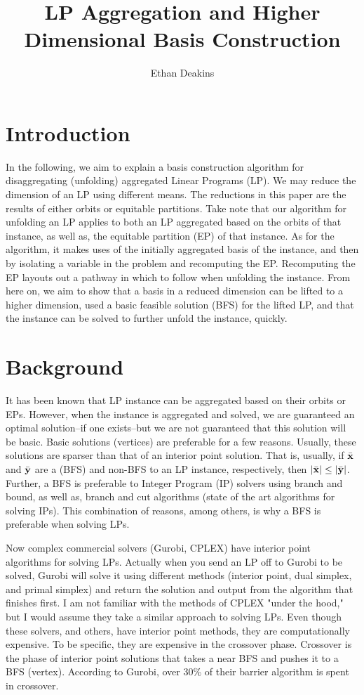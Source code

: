 \documentclass[11pt]{article} %
\title{LP Aggregation and Higher Dimensional Basis Construction}
\author{Ethan Deakins}
\begin{document}
 	\maketitle
 	
 	\section*{Introduction}
 	In the following, we aim to explain a basis construction algorithm for disaggregating (unfolding) aggregated Linear Programs (LP).  We may reduce the dimension of an LP using different means.  The reductions in this paper are the results of either orbits or equitable partitions.  Take note that our algorithm for unfolding an LP applies to both an LP aggregated based on the orbits of that instance, as well as, the equitable partition (EP) of that instance.  As for the algorithm, it makes uses of the initially aggregated basis of the instance, and then by isolating a variable in the problem and recomputing the EP.  Recomputing the EP layouts out a pathway in which to follow when unfolding the instance.  From here on, we aim to show that a basis in a reduced dimension can be lifted to a higher dimension, used a basic feasible solution (BFS) for the lifted LP, and that the instance can be solved to further unfold the instance, quickly.
 	
 	\section*{Background}
 	It has been known that LP instance can be aggregated based on their orbits or EPs.  However, when the instance is aggregated and solved, we are guaranteed an optimal solution--if one exists--but we are not guaranteed that this solution will be basic.  Basic solutions (vertices) are preferable for a few reasons.  Usually, these solutions are sparser than that of an interior point solution.  That is, usually, if $\bar{\bf{x}}$ and $\bar{\bf{y}}$ are a (BFS) and non-BFS to an LP instance, respectively, then $|\bar{\bf{x}}| \leq |\bar{\bf{y}}|$.  Further, a BFS is preferable to Integer Program (IP) solvers using branch and bound, as well as, branch and cut algorithms (state of the art algorithms for solving IPs).  This combination of reasons, among others, is why a BFS is preferable when solving LPs.  
 	
 	Now complex commercial solvers (Gurobi, CPLEX) have interior point algorithms for solving LPs.  Actually when you send an LP off to Gurobi to be solved, Gurobi will solve it using different methods (interior point, dual simplex, and primal simplex) and return the solution and output from the algorithm that finishes first.  I am not familiar with the methods of CPLEX "under the hood," but I would assume they take a similar approach to solving LPs.  Even though these solvers, and others, have interior point methods, they are computationally expensive.  To be specific, they are expensive in the crossover phase.  Crossover is the phase of interior point solutions that takes a near BFS and pushes it to a BFS (vertex).  According to Gurobi, over 30\% of their barrier algorithm is spent in crossover.  
 	
\end{document}
